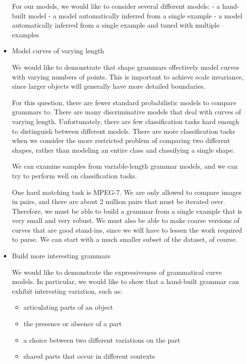 \begin{itemize}
For our models, we would like to consider several different models:
  - a hand-built model
  - a model automatically inferred from a single example
  - a model automatically inferred from a single example and tuned
    with multiple examples

\item Model curves of varying length

We would like to demonstrate that shape grammars effectively model
curves with varying numbers of points. This is important to achieve
scale invariance, since larger objects will generally have more
detailed boundaries.

For this question, there are fewer standard probabilistic models to
compare grammars to. There are many discriminative models that deal
with curves of varying length. Unfortunately, there are few
classification tasks hard enough to distinguish between different
models. There are more classification tasks when we consider the more
restricted problem of comparing two different shapes, rather than
modeling an entire class and classifying a single shape.

We can examine samples from variable-length grammar models, and we can
try to perform well on classification tasks.

One hard matching task is MPEG-7. We are only allowed to compare
images in pairs, and there are about 2 million pairs that must be
iterated over. Therefore, we must be able to build a grammar from a
single example that is very small and very robust. We must also be
able to make coarse versions of curves that are good stand-ins, since
we will have to lessen the work required to parse. We can start with a
much smaller subset of the dataset, of course.

\item Build more interesting grammars

We would like to demonstrate the expressiveness of grammatical curve
models. In particular, we would like to show that a hand-built grammar
can exhibit interesting variation, such as:
\begin{itemize}      
 \item articulating parts of an object
 \item the presence or absence of a part
 \item a choice between two different variations on the part
 \item shared parts that occur in different contexts 
\end{itemize}


\end{itemize}
